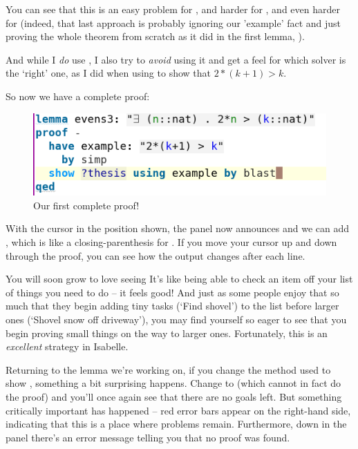 You can see that this is an easy problem for , and harder for , and even harder for  (indeed, that last approach is probably ignoring our 'example' fact and just proving the whole theorem from scratch as it did in the first lemma, ).

And while I \textit{do} use , I also try to \textit{avoid} using it and get a feel for which solver is the `right' one, as I did when using  to show that $2*(k+1) > k.$ 

So now we have a complete proof:
\begin{figure}[h]
    \includegraphics[width=0.75\linewidth]{TEXT/C01/Images/proof1.png}
    \caption{Our first complete proof!}
    \label{fig:first-proof}
\end{figure}

With the cursor in the position shown, the  panel now announces  and we can add , which is like a closing-parenthesis for . If you move your cursor up and down through the proof, you can see how the output changes after each line. 

You will soon grow to love seeing  It's like being able to check an item off your list of things you need to do -- it feels good! And just as some people enjoy that so much that they begin adding tiny tasks (`Find shovel') to the list before larger ones (`Shovel snow off driveway'), you may find yourself so eager to see  that you begin proving small things on the way to larger ones. Fortunately, this is an \textit{excellent} strategy in Isabelle. 

Returning to the lemma we're working on, if you change the method used to show , something a bit surprising happens. Change  to  (which cannot in fact do the proof) and you'll once again see that there are no goals left. But something critically important has happened -- red error bars appear on the right-hand side, indicating that this is a place where problems remain. Furthermore, down in the  panel there's an error message telling you that no proof was found. 


